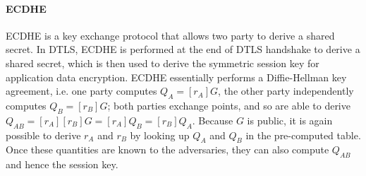 	
\paragraph{\textbf{ECDHE}}
	ECDHE\cite{rfc4492} is a key exchange protocol that allows two party to derive a shared secret. In DTLS, ECDHE is performed at the end of DTLS handshake to derive a shared secret, which is then used to derive the symmetric session key for application data encryption. ECDHE essentially performs a Diffie-Hellman key agreement, i.e. one party computes $Q_A = [r_A]G$, the other party independently computes $Q_B = [r_B]G$; both parties exchange points, and so are able to derive  $Q_{AB} = [r_A][r_B]G = [r_A]{Q_B} = [r_B]{Q_A}$. Because $G$ is public, it is again possible to derive $r_A$ and $r_B$ by looking up $Q_A$ and $Q_B$  in the pre-computed table. Once these quantities are known to the adversaries, they can also compute $Q_{AB}$ and hence the session key.


